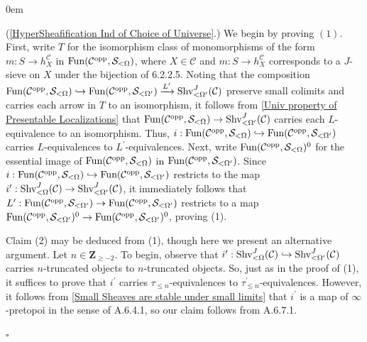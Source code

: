 \documentclass[10pt]{article}
\newcommand{\mS}{\mathcal S}
\newcommand{\C}{\mathcal C}
\newcommand{\ZZ}{\mathbb{Z}}
\def\ZZ{{\mathbf Z}}
\renewcommand{\qed}{\hfill$\square$}
\renewenvironment{proof}{\begin{addmargin}[1em]{0em}\begin{newproof}}{\end{newproof}\end{addmargin}\qed}
\theoremstyle{witharg}
\theoremstyle{witharg}
\theoremstyle{witharg2}
\begin{document}
\begin{proof} (\ref{HyperSheafification Ind of Choice of Universe}.) We begin by proving $(1)$. First, write $T$ for the isomorphism class of monomorphisms of the form $m:S\rightarrow h^\C_X$ in $\textnormal{Fun}(\C^{\textnormal{opp}},\mS_{<\Omega})$, where $X\in \C$ and $m:S\rightarrow h^\C_X$ corresponds to a $J$-sieve on $X$ under the bijection of  6.2.2.5. Noting that the composition $\textnormal{Fun}(\C^{\textnormal{opp}},\mS_{<\Omega})\hookrightarrow \textnormal{Fun}(\C^{\textnormal{opp}},\mS_{<\Omega^\prime})\xrightarrow{L^\prime}\textnormal{Shv}^J_{<\Omega^\prime}(\C)$ preserve small colimits and carries each arrow in $T$ to an isomorphism, it follows from \ref{Univ property of Presentable Localizations} that $\textnormal{Fun}(\C^{\textnormal{opp}},\mS_{<\Omega})\rightarrow \textnormal{Shv}^J_{<\Omega^\prime}(\C)$ carries each $L$-equivalence to an isomorphism. Thus, $i:\textnormal{Fun}(\C^{\textnormal{opp}},\mS_{<\Omega})\hookrightarrow \textnormal{Fun}(\C^{\textnormal{opp}},\mS_{<\Omega^\prime})$ carries $L$-equivalences to $L^\prime$-equivalences. Next, write $\textnormal{Fun}(\C^{\textnormal{opp}},\mS_{<\Omega})^0$ for the essential image of $\textnormal{Fun}(\C^{\textnormal{opp}},\mS_{<\Omega})$ in $\textnormal{Fun}(\C^{\textnormal{opp}},\mS_{<\Omega^\prime})$. Since $i:\textnormal{Fun}(\C^{\textnormal{opp}},\mS_{<\Omega})\hookrightarrow \textnormal{Fun}(\C^{\textnormal{opp}},\mS_{<\Omega^\prime})$ restricts to the map $i^\prime:\textnormal{Shv}^J_{<\Omega}(\C)\rightarrow\textnormal{Shv}^J_{<\Omega^\prime}(\C)$, it immediately follows that $L^\prime:\textnormal{Fun}(\C^{\textnormal{opp}},\mS_{<\Omega^\prime})\rightarrow \textnormal{Fun}(\C^{\textnormal{opp}},\mS_{<\Omega^\prime})$ restricts to a map $\textnormal{Fun}(\C^{\textnormal{opp}},\mS_{<\Omega^\prime})^0\rightarrow \textnormal{Fun}(\C^{\textnormal{opp}},\mS_{<\Omega^\prime})^0$, proving (1).


Claim (2) may be deduced from (1), though here we present an alternative argument. Let $n\in \ZZ_{\geq -2}$. To begin, observe that $i^\prime:\textnormal{Shv}^J_{<\Omega}(\C)\hookrightarrow \textnormal{Shv}^J_{<\Omega^\prime}(\C)$ carries $n$-truncated objects to $n$-truncated objects. So, just as in the proof of (1), it suffices to prove that $i^\prime$ carries $\tau_{\leq n}$-equivalences to $\tau^\prime_{\leq n}$-equivalences. However, it follows from \ref{Small Sheaves are stable under small limits} that $i^\prime$ is a map of $\infty$-pretopoi in the sense of  A.6.4.1, so our claim follows from  A.6.7.1.  



\end{proof}
\end{document}

